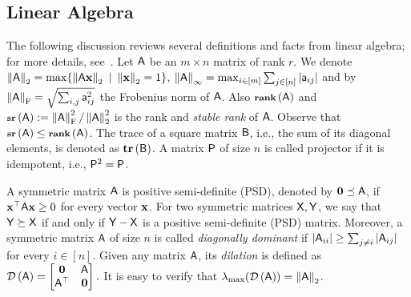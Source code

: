 \subsection{Linear Algebra}
%
The following discussion reviews several definitions and facts from linear algebra; for more details, see~\cite{book:matrix:Bhatia,book:GVL,book:matrix_analysis:HornJohnson}. Let ${\mathsf{A} }$ be an $m\times n$ matrix of rank $r$. We denote $\left\|{\mathsf{A} }\right\|_2=\max \{ \left\|{\mathsf{A} } \mathbf{x}\right\|_2~|~\left\|\mathbf{x}\right\|_2 =1 \}$, $\left\|{\mathsf{A} }\right\|_\infty = \max_{i\in{[m]}} \sum_{j\in{[n]}} |{\mathsf{a} }_{ij}|$ and by $\left\|{\mathsf{A} }\right\|_{\textrm{F}}=\sqrt{\sum_{i,j}{{\mathsf{a} }_{ij}^2}}$ the Frobenius norm of ${\mathsf{A} }$. Also $\operatorname{\textbf{{\footnotesize rank}}}\left({\mathsf{A} }\right)$ and $\operatorname{\textbf{\footnotesize sr}}\left({\mathsf{A} }\right):=\left\|{\mathsf{A} }\right\|_{\textrm{F}}^2/\left\|{\mathsf{A} }\right\|_2^2$ is the rank and \emph{stable rank} of ${\mathsf{A} }$. Observe that $\operatorname{\textbf{\footnotesize sr}}\left({\mathsf{A} }\right)\leq \operatorname{\textbf{{\footnotesize rank}}}\left({\mathsf{A} }\right)$. The trace of a square matrix ${\mathsf{B} }$, i.e., the sum of its diagonal elements, is denoted as $\operatorname{\textbf{tr}}\left({\mathsf{B} }\right)$. A matrix ${\mathsf{P} }$ of size $n$ is called projector if it is idempotent, i.e., ${\mathsf{P} }^2 ={\mathsf{P} }$.
%

A symmetric matrix ${\mathsf{A} }$ is positive semi-definite (PSD), denoted by $\mathbf{0} \preceq {\ensuremath{\mathsf{A} }}$, if $\mathbf{x}^\top {\ensuremath{\mathsf{A} }} \mathbf{x} \geq 0$ for every vector $\mathbf{x}$. For two symmetric matrices ${\mathsf{X} },{\mathsf{Y} }$, we say that ${\mathsf{Y} }\succeq {\ensuremath{\mathsf{X} }}$ if and only if ${\mathsf{Y} }-{\mathsf{X} }$ is a positive semi-definite (PSD) matrix. Moreover, a symmetric matrix ${\mathsf{A} }$ of size $n$ is called \emph{diagonally dominant} if $|{\mathsf{A} }_{ii}| \geq \sum_{j\neq i} |{\mathsf{A} }_{ij}|$ for every $i\in{[n]}$. Given any matrix ${\mathsf{A} }$, its \emph{dilation} is defined as $\mathcal{D}\left({\mathsf{A} }\right) = \left[\begin{matrix}
        \mathbf{0}      & {\mathsf{A} } \\
	{\mathsf{A} }^\top & \mathbf{0}
       \end{matrix}\right].
$
It is easy to verify that $\lambda_{\max}(\mathcal{D}\left({\mathsf{A} }\right)) = \left\|{\mathsf{A} }\right\|_2$.
%

